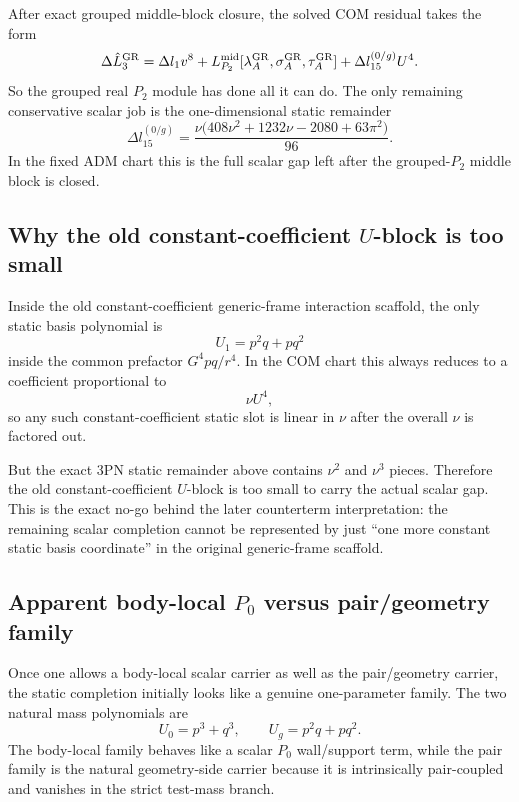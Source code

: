 \documentclass[11pt]{article}
\begin{document}
After exact grouped middle-block closure, the solved COM residual takes the form
\[
\Delta \hat L_3^{\rm GR}
=
\Delta l_1 v^8
+
L_{P_2}^{\rm mid}[\lambda_A^{\rm GR},\sigma_A^{\rm GR},\tau_A^{\rm GR}]
+
\Delta l_{15}^{(0/g)}U^4.
\]
So the grouped real $P_2$ module has done all it can do. The only remaining conservative scalar job is the one-dimensional static remainder
\[
\boxed{
\Delta l_{15}^{(0/g)}
=
\frac{\nu\bigl(408\nu^2+1232\nu-2080+63\pi^2\bigr)}{96}.
}
\]
In the fixed ADM chart this is the full scalar gap left after the grouped-$P_2$ middle block is closed.

\subsection{Why the old constant-coefficient \texorpdfstring{$U$}{U}-block is too small}
\label{app:static_p0_geometry_counterterm_sigma_collapse:U_block_nogo}

Inside the old constant-coefficient generic-frame interaction scaffold, the only static basis polynomial is
\[
U_1=p^2q+pq^2
\]
inside the common prefactor $G^4pq/r^4$. In the COM chart this always reduces to a coefficient proportional to
\[
\nu U^4,
\]
so any such constant-coefficient static slot is linear in $\nu$ after the overall $\nu$ is factored out.

But the exact $3$PN static remainder above contains $\nu^2$ and $\nu^3$ pieces. Therefore the old constant-coefficient $U$-block is too small to carry the actual scalar gap. This is the exact no-go behind the later counterterm interpretation: the remaining scalar completion cannot be represented by just ``one more constant static basis coordinate'' in the original generic-frame scaffold.

\subsection{Apparent body-local \texorpdfstring{$P_0$}{P 0} versus pair/geometry family}
\label{app:static_p0_geometry_counterterm_sigma_collapse:apparent_family}

Once one allows a body-local scalar carrier as well as the pair/geometry carrier, the static completion initially looks like a genuine one-parameter family. The two natural mass polynomials are
\[
U_0=p^3+q^3,
\qquad
U_g=p^2q+pq^2.
\]
The body-local family behaves like a scalar $P_0$ wall/support term, while the pair family is the natural geometry-side carrier because it is intrinsically pair-coupled and vanishes in the strict test-mass branch.
\end{document}
